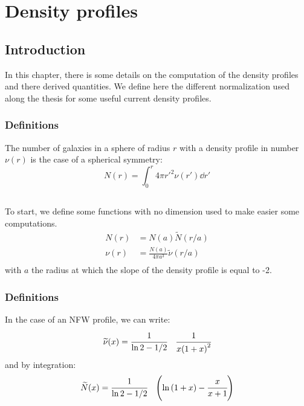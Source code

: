 \chapter{Density profiles}

\section{Introduction}

In this chapter, there is some details on the computation of the density
profiles and there derived quantities. We define here the different
normalization used along the thesis for some useful current density profiles.

\subsection{Definitions}

The number of galaxies in a sphere of radius $r$ with a density profile in
number $\nu(r)$ is the case of a spherical symmetry:
%
\begin{equation}
    N(r)=\int_0^r4\pi {r'}^2 \nu(r')\dd{r'}
\end{equation}

\section{\citet{NFW+97}}

To start, we define some functions with no dimension used to make easier some
computations.
%
\begin{align*}
        N(r)&={N(a)}{\widetilde{N}{(r/a)}}\\
        \nu(r)&=\frac{N(a)}{4\pi{a^3}}\widetilde{\nu}{(r/a)}\\
\end{align*}
%
with $a$ the radius at which the slope of the density profile is equal to -2.

\subsection{Definitions}

In the case of an NFW profile, we can write:
%
\begin{equation}
    \widetilde{\nu}(x)=\cfrac{1}{\ln2-1/2}\quad\cfrac{1}{x{(1+x)}^2}
\end{equation}
%
and by integration:
%
\begin{equation}
    \widetilde{N}(x)=\cfrac{1}{\ln2-1/2}\quad{\left(\ln{(1+x)}-\cfrac{x}{x+1}\right)}
\end{equation}

